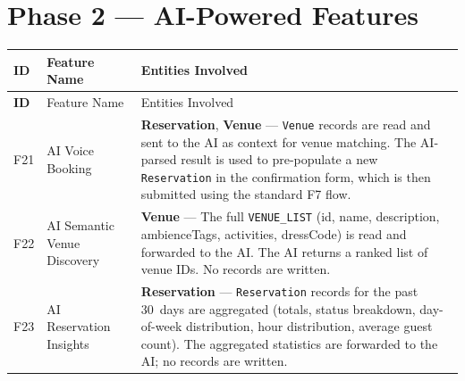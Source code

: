 \documentclass[12pt,a4paper]{article}
\begin{document}
\section{Phase 2 --- AI-Powered Features}

\begin{longtable}{>{\bfseries}l L{4.5cm} L{7.5cm}}
    \toprule
    ID & Feature Name & Entities Involved \\
    \midrule
    \endfirsthead
    \toprule
    ID & Feature Name & Entities Involved \\
    \midrule
    \endhead
    \bottomrule
    \endlastfoot

    F21 &
    AI Voice Booking &
    \textbf{Reservation}, \textbf{Venue} ---
    \texttt{Venue} records are read and sent to the AI as context for
    venue matching. The AI-parsed result is used to pre-populate a new
    \texttt{Reservation} in the confirmation form, which is then
    submitted using the standard F7 flow. \\
    \addlinespace

    F22 &
    AI Semantic Venue Discovery &
    \textbf{Venue} ---
    The full \texttt{VENUE\_LIST} (id, name, description,
    ambienceTags, activities, dressCode) is read and forwarded to
    the AI. The AI returns a ranked list of venue IDs. No records are
    written. \\
    \addlinespace

    F23 &
    AI Reservation Insights &
    \textbf{Reservation} ---
    \texttt{Reservation} records for the past 30~days are aggregated
    (totals, status breakdown, day-of-week distribution, hour
    distribution, average guest count). The aggregated statistics are
    forwarded to the AI; no records are written. \\

\end{longtable}
\end{document}
